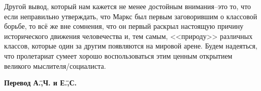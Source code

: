 Другой вывод, который нам кажется не менее достойным внимания\---это то, что если неправильно утверждать, что Маркс был первым заговорившим о классовой борьбе, то всё же вне сомнения, что он первый раскрыл настоящую причину исторического движения человечества и, тем самым, <<природу>> различных классов, которые один за другим появляются на мировой арене. Будем надеяться, что пролетариат сумеет хорошо воспользоваться этим ценным открытием великого мыслителя\-/социалиста.

\begin{flushright}
 \textbf{Перевод А.\=,Ч. и Е.\=,С.}\hspace*{2em}
\end{flushright}
